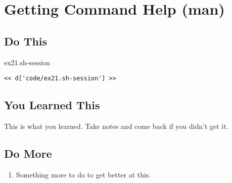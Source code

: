 \chapter{Getting Command Help (man)}

\section{Do This}

\begin{code}{ex21.sh-session}
\begin{Verbatim}
<< d['code/ex21.sh-session'] >>
\end{Verbatim}
\end{code}


\section{You Learned This}

This is what you learned.  Take notes and come back if you didn't get it.

\section{Do More}

\begin{enumerate}
\item Something more to do to get better at this.
\end{enumerate}

